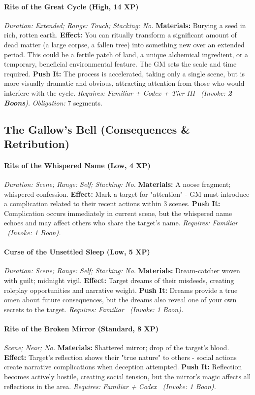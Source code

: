 \documentclass[12pt,twoside]{book}
\begin{document}
\paragraph{Rite of the Great Cycle (High, 14 XP)} \emph{Duration: Extended; Range: Touch; Stacking: No.}
\textbf{Materials:} Burying a seed in rich, rotten earth.
\textbf{Effect:} You can ritually transform a significant amount of dead matter (a large corpse, a fallen tree) into something new over an extended period. This could be a fertile patch of land, a unique alchemical ingredient, or a temporary, beneficial environmental feature. The GM sets the scale and time required.
\textbf{Push It:} The process is accelerated, taking only a single scene, but is more visually dramatic and obvious, attracting attention from those who would interfere with the cycle.
\emph{Requires: Familiar + Codex + Tier III \ (\textit{Invoke:} \textbf{2 Boons}).}
\emph{Obligation:} 7 segments.

\subsection{The Gallow's Bell (Consequences \& Retribution)}
\paragraph{Rite of the Whispered Name (Low, 4 XP)} \emph{Duration: Scene; Range: Self; Stacking: No.}
\textbf{Materials:} A noose fragment; whispered confession.
\textbf{Effect:} Mark a target for "attention" - GM must introduce a complication related to their recent actions within 3 scenes.
\textbf{Push It:} Complication occurs immediately in current scene, but the whispered name echoes and may affect others who share the target's name.
\emph{Requires: Familiar \ (\textit{Invoke:} 1 Boon).}
\paragraph{Curse of the Unsettled Sleep (Low, 5 XP)} \emph{Duration: Scene; Range: Self; Stacking: No.}
\textbf{Materials:} Dream-catcher woven with guilt; midnight vigil.
\textbf{Effect:} Target dreams of their misdeeds, creating roleplay opportunities and narrative weight.
\textbf{Push It:} Dreams provide a true omen about future consequences, but the dreams also reveal one of your own secrets to the target.
\emph{Requires: Familiar \ (\textit{Invoke:} 1 Boon).}
\paragraph{Rite of the Broken Mirror (Standard, 8 XP)} \emph{Scene; Near; No.}
\textbf{Materials:} Shattered mirror; drop of the target's blood.
\textbf{Effect:} Target's reflection shows their "true nature" to others - social actions create narrative complications when deception attempted.
\textbf{Push It:} Reflection becomes actively hostile, creating social tension, but the mirror's magic affects all reflections in the area.
\emph{Requires: Familiar + Codex \ (\textit{Invoke:} 1 Boon).}
\end{document}
